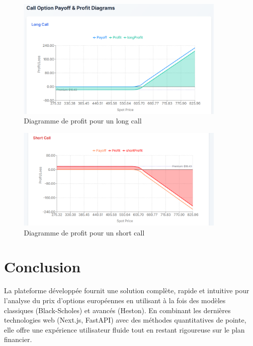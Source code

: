\begin{figure}[H] \centering \includegraphics[width=0.9\textwidth]{images/8.png} \caption{Diagramme de profit pour un long call} \end{figure}

\begin{figure}[H] \centering \includegraphics[width=0.9\textwidth]{images/9.png} \caption{Diagramme de profit pour un short call} \end{figure}

\section{Conclusion}

La plateforme développée fournit une solution complète, rapide et intuitive pour l'analyse du prix d'options européennes en utilisant à la fois des modèles classiques (Black-Scholes) et avancés (Heston). En combinant les dernières technologies web (Next.js, FastAPI) avec des méthodes quantitatives de pointe, elle offre une expérience utilisateur fluide tout en restant rigoureuse sur le plan financier.